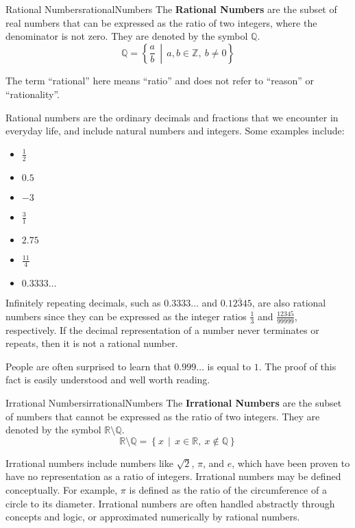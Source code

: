 \begin{definition}{Rational Numbers}{rationalNumbers}
  The \textbf{Rational Numbers} are the subset of real numbers that can be expressed as the
  ratio of two integers, where the denominator is not zero. They are denoted by
  the symbol \(\mathbb{Q}\).
  \[
    \mathbb{Q} = \left\{ \frac{a}{b} \,\middle|\, a, b \in \mathbb{Z},\ b \ne 0 \right\}
  \]

  The term ``rational'' here means ``ratio'' and does not refer to ``reason'' or ``rationality''.
\end{definition}

Rational numbers are the ordinary decimals and fractions that we encounter in everyday life, and include
natural numbers and integers. Some examples include:
\begin{itemize}
\item \(\frac{1}{2}\)
\item \(0.5\)
\item \(-3\)
\item \(\frac{3}{1}\)
\item \(2.75\)
\item \(\frac{11}{4}\)
\item \(0.3333\ldots\)
\end{itemize}

Infinitely repeating decimals, such as \(0.3333\ldots\) and \(0.\overline{12345}\), are also rational
numbers since they can be expressed as the integer ratios \(\frac{1}{3}\) and \(\frac{12345}{99999}\),
respectively. If the decimal representation of a number never terminates or repeats, then it is
not a rational number.

\begin{advancedTopic}
  People are often surprised to learn that \( 0.999\ldots \) is equal to \( 1 \). The proof of this
  fact is easily understood and well worth reading.
\end{advancedTopic}

\begin{definition}{Irrational Numbers}{irrationalNumbers}
  The \textbf{Irrational Numbers} are the subset of numbers that cannot be expressed
  as the ratio of two integers. They are denoted by the symbol \(\mathbb{R} \setminus \mathbb{Q}\).
  \[
    \mathbb{R} \setminus \mathbb{Q} = \left\{ x \,\middle|\, x \in \mathbb{R},\ x \notin \mathbb{Q} \right\}
  \]
\end{definition}

Irrational numbers include numbers like \(\sqrt{2}\), \(\pi\), and \( e \), which have been proven to
have no representation as a ratio of integers. Irrational numbers may be defined conceptually. For
example, \(\pi\) is defined as the ratio of the circumference of a circle to its diameter. Irrational
numbers are often handled abstractly through concepts and logic, or approximated numerically by rational numbers.


